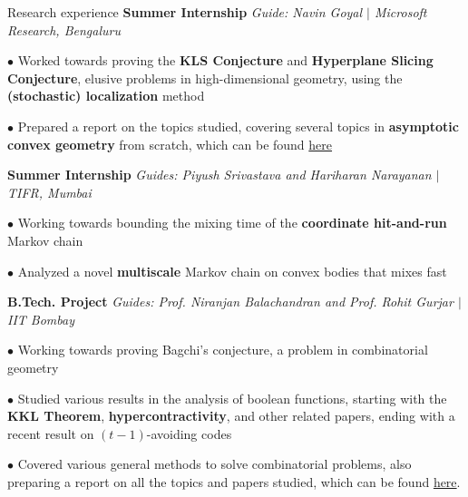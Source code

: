 \begin{rubric}{Research experience}
    \entry*[2021] \textbf{Summer Internship} \hfill \emph{Guide: Navin Goyal $\mid$ Microsoft Research, Bengaluru}
        
        $\bullet$ Worked towards proving the \textbf{KLS Conjecture} and \textbf{Hyperplane Slicing Conjecture}, elusive problems in high-dimensional geometry, using the \textbf{(stochastic) localization} method

        $\bullet$ Prepared a report on the topics studied, covering several topics in \textbf{asymptotic convex geometry} from scratch, which can be found \href{https://amitrajaraman.github.io/notes/convex-geometry/main.pdf}{here}

    \entry*[2022] \textbf{Summer Internship} \hfill \emph{Guides: Piyush Srivastava and Hariharan Narayanan $\mid$ TIFR, Mumbai}

        $\bullet$ Working towards bounding the mixing time of the \textbf{coordinate hit-and-run} Markov chain

        $\bullet$ Analyzed a novel \textbf{multiscale} Markov chain on convex bodies that mixes fast

    \entry*[\phantom{.}2022] \textbf{B.Tech. Project} \hfill \emph{Guides: Prof. Niranjan Balachandran and Prof. Rohit Gurjar $\mid$ IIT Bombay}

        $\bullet$ Working towards proving Bagchi's conjecture, a problem in combinatorial geometry

        $\bullet$ Studied various results in the analysis of boolean functions, starting with the \textbf{KKL Theorem}, \textbf{hypercontractivity}, and other related papers, ending with a recent result on $(t-1)$-avoiding codes

        $\bullet$ Covered various general methods to solve combinatorial problems, also preparing a report on all the topics and papers studied, which can be found \href{https://amitrajaraman.github.io/research/pls/btp-1.pdf}{here}.

\end{rubric}